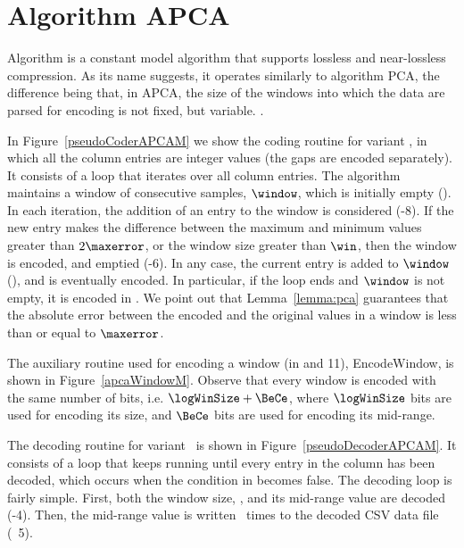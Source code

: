 
\clearpage

\section{Algorithm APCA}
\label{algo:apca}


Algorithm \textit{\APCAfull} \cite{coder:apca} is a constant model algorithm that supports lossless and near-lossless compression. As its name suggests, it operates similarly to algorithm PCA, the difference being that, in APCA, the size of the windows into which the data are parsed for encoding is not fixed, but variable. \WindowParam {}.


In Figure~\ref{pseudoCoderAPCAM} we show the coding routine for variant \maskalgo, in which all the column entries are integer values (the gaps are encoded separately). It consists of a loop that iterates over all column entries. The algorithm maintains a window of consecutive samples, $\window$, which is initially empty (). In each iteration, the addition of an entry to the window is considered (-8). If the new entry makes the difference between the maximum and minimum values greater than $2\maxerror$, or the window size greater than $\win$, then the window is encoded, and emptied (-6). In any case, the current entry is added to $\window$ (), and is eventually encoded. In particular, if the loop ends and $\window$ is not empty, it is encoded in . We point out that Lemma~\ref{lemma:pca} guarantees that the absolute error between the encoded and the original values in a window is less than or equal to $\maxerror$.





\vspace{+2pt}
The auxiliary routine used for encoding a window (in  and 11), EncodeWindow, is shown in Figure~\ref{apcaWindowM}. Observe that every window is encoded with the same number of bits, i.e. $\logWinSize +\BeCe$, where $\logWinSize$ bits are used for encoding its size, and $\BeCe$ bits are used for encoding its mid-range.
\vspace{+3pt}





\clearpage


The decoding routine for variant \maskalgo\ is shown in Figure~\ref{pseudoDecoderAPCAM}. It consists of a loop that keeps running until every entry in the column has been decoded, which occurs when the condition in  becomes false. The decoding loop is fairly simple. First, both the window size, \sizee, and its mid-range value are decoded (-4). Then, the mid-range value is written \sizee\ times to the decoded CSV data file (\Line~5).


